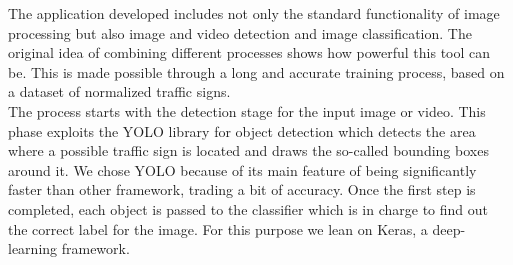 The application developed includes not only the standard functionality of image processing but also image and video detection and image classification. The original idea of combining different processes shows how powerful this tool can be. This is made possible through a long and accurate training process, based on a dataset of normalized traffic signs.\\ The process starts with the detection stage for the input image or video. This phase exploits the YOLO library for object detection which detects the area where a possible traffic sign is located and draws the so-called bounding boxes around it. We chose YOLO because of its main feature of being significantly faster than other framework, trading a bit of accuracy. Once the first step is completed, each object is passed to the classifier which is in charge to find out the correct label for the image. For this purpose we lean on Keras, a deep-learning framework.
